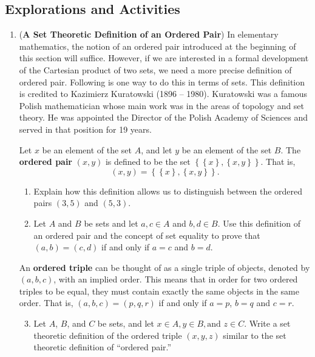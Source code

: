 \subsection*{Explorations and Activities}
\setcounter{oldenumi}{\theenumi}
\begin{enumerate} \setcounter{enumi}{\theoldenumi}
  \item (\textbf{A Set Theoretic Definition of an Ordered Pair}) 
\label{exer:defoforderedpair}%
In elementary mathematics, the notion of an ordered pair introduced at the beginning of this section will suffice.  However, if we are interested in a formal development of the Cartesian product of two sets, we need a more precise definition of ordered pair.  Following is one way to do this in terms of sets.  This definition is credited to Kazimierz Kuratowski (1896 -- 1980).
%
Kuratowski was a famous Polish mathematician whose main work was in the areas of topology and set theory.  He was appointed the Director of the Polish Academy of Sciences and served in that position for 19 years.

Let  $x$  be an element of the set  $A$, and let  $y$  be an element of the set  $B$.  The \textbf{ordered pair}
%
 $\left( {x,y} \right)$ is defined to be the set  
$\left\{ {\left\{ x \right\},\left\{ {x,y} \right\}} \right\}$.  That is,
\[
\left( {x,y} \right) = \left\{ {\left\{ x \right\},\left\{ {x,y} \right\}} \right\}\!.
\]

\begin{enumerate}
\item Explain how this definition allows us to distinguish between the ordered pairs  $\left( {3,5} \right)$  and  $\left( {5,3} \right)$.

\item Let  $A$  and  $B$  be sets and let  $a,c \in A$  and  $b,d \in B$.  Use this definition of an ordered pair and the concept of set equality to prove that  $\left( {a,b} \right) = \left( {c,d} \right)$  if and only if  $a = c$ and $b = d$.
\end{enumerate}

An \textbf{ordered triple}
%
 can be thought of as a single triple of objects, denoted by  $\left( {a,b,c} \right)$, with an implied order.  This means that in order for two ordered triples to be equal, they must contain exactly the same objects in the same order.  That is,  $\left( {a,b,c} \right) = \left( {p,q,r} \right)$ if and only if  $a = p$, $b = q$ and $c = r$.

\begin{enumerate} \setcounter{enumii}{2}

\item Let  $A$, $B$, and  $C$  be sets, and let  $x \in A,y \in B,\text{and }z \in C$.  Write a set theoretic definition of the ordered triple  $\left( {x,y,z} \right)$ similar to the set theoretic definition of ``ordered pair.''
\end{enumerate}

\end{enumerate}
\hbreak

\endinput
